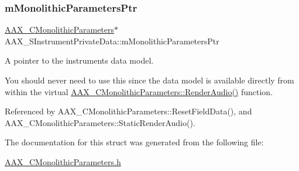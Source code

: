 \subsubsection{\texorpdfstring{mMonolithicParametersPtr}{mMonolithicParametersPtr}}
{\footnotesize\ttfamily \mbox{\hyperlink{a01969}{A\+A\+X\+\_\+\+C\+Monolithic\+Parameters}}$\ast$ A\+A\+X\+\_\+\+S\+Instrument\+Private\+Data\+::m\+Monolithic\+Parameters\+Ptr}



A pointer to the instrument\textquotesingle{}s data model. 

You should never need to use this since the data model is available directly from within the virtual \mbox{\hyperlink{a01969_a04f2f73d70ea28c17747c68fc3a20fc8}{A\+A\+X\+\_\+\+C\+Monolithic\+Parameters\+::\+Render\+Audio()}} function. 

Referenced by A\+A\+X\+\_\+\+C\+Monolithic\+Parameters\+::\+Reset\+Field\+Data(), and A\+A\+X\+\_\+\+C\+Monolithic\+Parameters\+::\+Static\+Render\+Audio().



The documentation for this struct was generated from the following file\+:\begin{DoxyCompactItemize}
\item 
\mbox{\hyperlink{a00746}{A\+A\+X\+\_\+\+C\+Monolithic\+Parameters.\+h}}\end{DoxyCompactItemize}
